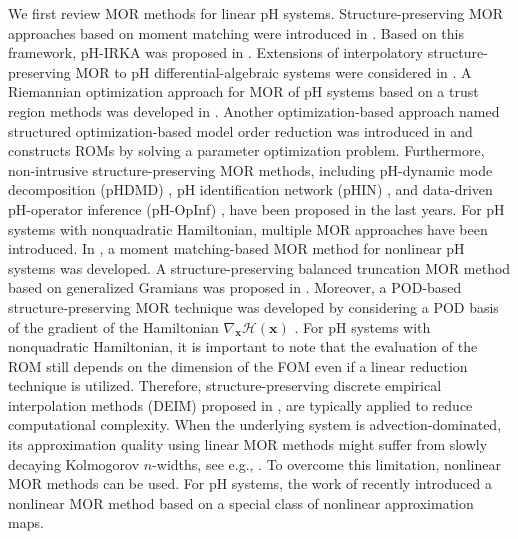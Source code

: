 \documentclass{article}
\newcommand{\curlyH}{\mathcal{H}}
\newcommand{\statex}{{\bm x}}
\newcommand{\pH}{\textsf{pH}\xspace}
\newcommand{\DEIM}{\textsf{DEIM}\xspace}
\newcommand{\DMD}{\textsf{DMD}\xspace}
\newcommand{\pHIN}{\textsf{pHIN}\xspace}
\newcommand{\OpInf}{\textsf{OpInf}\xspace}
\newcommand{\IRKA}{\textsf{IRKA}\xspace}
\newcommand{\POD}{\textsf{POD}\xspace}
\newcommand{\FOM}{\textsf{FOM}\xspace}
\newcommand{\ROM}{\textsf{ROM}\xspace}
\newcommand{\ROMs}{\textsf{ROM}s\xspace}
\newcommand{\MOR}{\textsf{MOR}\xspace}
\begin{document}
		We first review MOR methods for linear pH systems. Structure-preserving \MOR approaches based on moment matching were introduced in \cite{ionescu2013families, wolf2010passivity}.
		Based on this framework, \pH-\IRKA was proposed in \cite{gugercin2012structure}.  
		Extensions of interpolatory structure-preserving \MOR to \pH differential-algebraic systems were considered in \cite{Beattie2022}.
		A Riemannian optimization approach for \MOR of \pH systems based on a trust region methods was developed in \cite{sato2018riemannian}. Another optimization-based approach named structured optimization-based model order reduction was introduced in \cite{schwerdtner2023sobmor} and constructs \ROMs by solving a parameter optimization problem. 
		Furthermore, non-intrusive structure-preserving \MOR methods, including  \pH-dynamic mode decomposition (\pH\DMD) \cite{morandin2023port}, \pH identification network (\pHIN) \cite{rettberg2024data}, and data-driven \pH-operator inference (\pH-\OpInf) \cite{geng2025data}, have been proposed in the last years.
		For \pH systems with nonquadratic Hamiltonian, multiple \MOR approaches have been introduced. 
		In \cite{ionescu2013moment}, a moment matching-based MOR method for nonlinear pH systems was developed. A structure-preserving balanced truncation \MOR method based on generalized Gramians was proposed in \cite{kawano2018structure}.
		Moreover, a \POD-based structure-preserving \MOR technique was developed by considering a \POD basis of the gradient of the Hamiltonian $\nabla_{\statex}\curlyH(\statex)$ \cite{chaturantabut2016structure}. For \pH systems with nonquadratic Hamiltonian, it is important to note that the evaluation of the \ROM still depends on the dimension of the \FOM even if a linear reduction technique is utilized. Therefore, structure-preserving discrete empirical interpolation methods (\DEIM) proposed in \cite{chaturantabut2016structure, pagliantini2023gradient}, are typically applied to reduce computational complexity.
		When the underlying system is advection-dominated, its approximation quality using linear \MOR methods might suffer from slowly decaying Kolmogorov $n$-widths, see e.g., \cite{greif2019decay, ohlberger2016reduced}. 
		To overcome this limitation, nonlinear \MOR methods can be used. 
		For \pH systems, the work of \cite{schulze2023structure} recently introduced a nonlinear \MOR method based on a special class of nonlinear approximation maps. 
\end{document}

